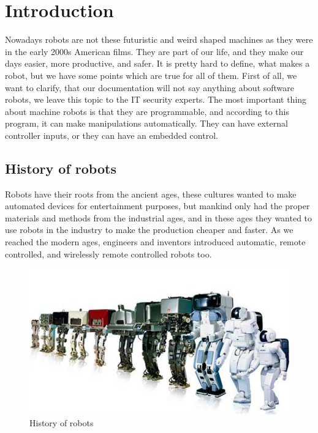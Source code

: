 \newpage

\thispagestyle{empty}

\chapter{Introduction}

	\hspace{15pt}Nowadays robots are not these futuristic and weird shaped machines as they were in the early 2000s American films. They are part of our life, and they make our days easier, more productive, and safer. It is pretty hard to define, what makes a robot, but we have some points which are true for all of them. First of all, we want to clarify, that our documentation will not say anything about software robots, we leave this topic to the IT security experts. The most important thing about machine robots is that they are programmable, and according to this program, it can make manipulations automatically. They can have external controller inputs, or they can have an embedded control. \cite{robotics2}






	\section{History of robots}

		\hspace{15pt}Robots have their roots from the ancient ages, these cultures wanted to make automated devices for entertainment purposes, but mankind only had the proper materials and methods from the industrial ages, and in these ages they wanted to use robots in the industry to make the production cheaper and faster. As we reached the modern ages, engineers and inventors introduced automatic, remote controlled, and wirelessly remote controlled robots too.	\cite{robotics1}
		
		\begin{figure}[H]
			\centering
			\includegraphics[width=\textwidth]{./images/history_of_robots}
			\caption{History of robots\cite{robots}}
		\end{figure}


